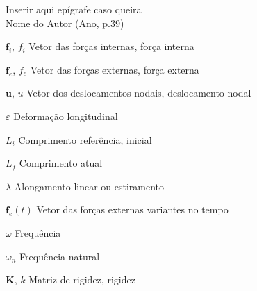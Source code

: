 \documentclass[oneside, a4paper, 12pt, chapter=TITLE]{abntex2} 	%
\begin{document}



\begin{epigrafe}
	\vspace*{\fill}
	\begin{flushright}
		Inserir aqui epígrafe caso queira\\
		\vspace*{1cm}
		Nome do Autor (Ano, p.39)
	\end{flushright}
\end{epigrafe}

\listoffigures*
\cleardoublepage
\listoftables*
\cleardoublepage
\listofalgorithms
\cleardoublepage
\begin{simbolos}
	\item[$\boldsymbol f_i$, $f_i$]\quad Vetor das forças internas, força interna
	\item[$\boldsymbol f_e$, $f_e$]\quad Vetor das forças externas, força externa
	\item[$\boldsymbol u$, $u$]\quad Vetor dos deslocamentos nodais, deslocamento nodal
	\item [$\varepsilon$]\quad Deformação longitudinal
	\item [$L_i$]\quad Comprimento referência, inicial
	\item [$L_f$]\quad Comprimento atual
	\item [$\lambda$]\quad Alongamento linear ou estiramento
	\item[$\boldsymbol f_e(t)$]\quad Vetor das forças externas variantes no tempo
	\item[$\omega$]\quad Frequência
	\item[$\omega_{n}$]\quad Frequência natural
	\item [$\boldsymbol K $, $ k $]\quad Matriz de rigidez, rigidez
\end{simbolos}
\end{document}
